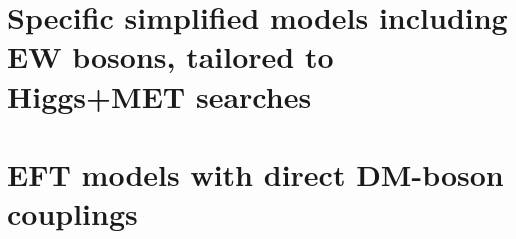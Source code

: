\section{Specific simplified models including EW bosons, tailored to Higgs+MET searches}


\section{EFT models with direct DM-boson couplings}
\label{sec:EFT_models_with_direct_DM_boson_couplings}



